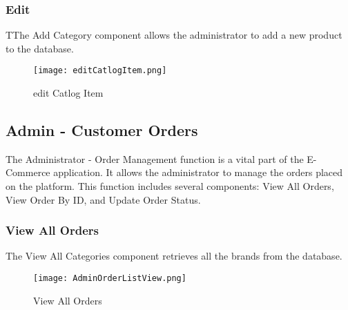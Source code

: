 \subsubsection[]{Edit}
TThe Add Category component allows the administrator to add a new product to the database.
\begin{figure}[H]
    \texttt{[image: editCatlogItem.png]}
    \caption{edit Catlog Item}
    \label{fig:editCatlogItem}
\end{figure}

\subsection{Admin - Customer Orders}
The Administrator - Order Management function is a vital part of the E-Commerce application. It allows the administrator to manage the orders placed on the platform. This function includes several components: View All Orders, View Order By ID, and Update Order Status.
\subsubsection[]{View All Orders}
The View All Categories component retrieves all the brands from the database.
\begin{figure}[H]
    \texttt{[image: AdminOrderListView.png]}
    \caption{View All Orders}
    \label{fig:AdminOrderListView}
\end{figure}
